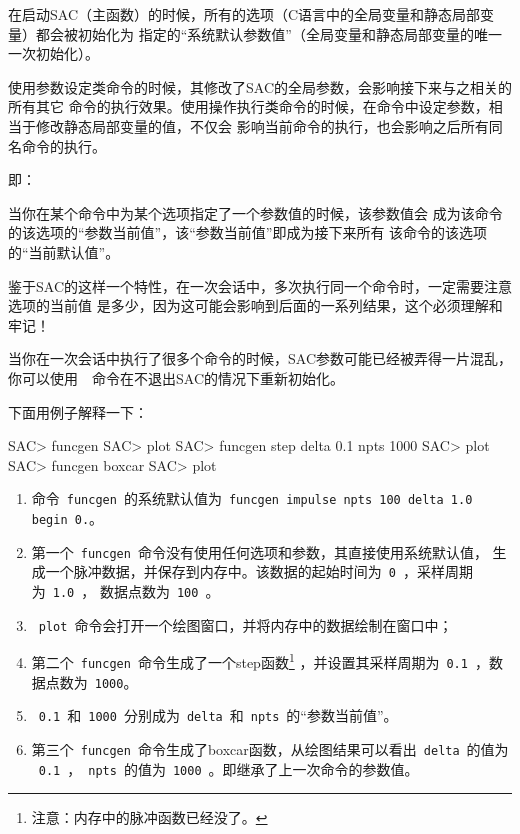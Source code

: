 在启动SAC（主函数）的时候，所有的选项（C语言中的全局变量和静态局部变量）都会被初始化为
指定的``系统默认参数值''（全局变量和静态局部变量的唯一一次初始化）。

使用参数设定类命令的时候，其修改了SAC的全局参数，会影响接下来与之相关的所有其它
命令的执行效果。使用操作执行类命令的时候，在命令中设定参数，相当于修改静态局部变量的值，不仅会
影响当前命令的执行，也会影响之后所有同名命令的执行。

即：

当你在某个命令中为某个选项指定了一个参数值的时候，该参数值会
成为该命令的该选项的``参数当前值''，该``参数当前值''即成为接下来所有
该命令的该选项的``当前默认值''。

鉴于SAC的这样一个特性，在一次会话中，多次执行同一个命令时，一定需要注意选项的当前值
是多少，因为这可能会影响到后面的一系列结果，这个必须理解和牢记！

\begin{Tips}
当你在一次会话中执行了很多个命令的时候，SAC参数可能已经被弄得一片混乱，
你可以使用~~命令在不退出SAC的情况下重新初始化。
\end{Tips}

下面用例子解释一下：
\begin{SACCode}
SAC> funcgen
SAC> plot
SAC> funcgen step delta 0.1 npts 1000
SAC> plot
SAC> funcgen boxcar
SAC> plot
\end{SACCode}

\begin{enumerate}
\item 命令~\lstinline{funcgen}~的系统默认值为~\lstinline{funcgen impulse npts 100 delta 1.0 begin 0.}。
\item 第一个~\lstinline{funcgen}~命令没有使用任何选项和参数，其直接使用系统默认值，
    生成一个脉冲数据，并保存到内存中。该数据的起始时间为~\lstinline{0}~，采样周期为~\lstinline{1.0}~，
    数据点数为~\lstinline{100}~。
\item ~\lstinline{plot}~命令会打开一个绘图窗口，并将内存中的数据绘制在窗口中；
\item 第二个~\lstinline{funcgen}~命令生成了一个step函数\footnote{注意：内存中的脉冲函数已经没了。}
    ，并设置其采样周期为~\lstinline{0.1}~，数据点数为~\lstinline{1000}。
\item ~\lstinline{0.1}~和~\lstinline{1000}~分别成为~\lstinline{delta}~和~\lstinline{npts}~的``参数当前值''。
\item 第三个~\lstinline{funcgen}~命令生成了boxcar函数，从绘图结果可以看出~\lstinline{delta}~的值为
    ~\lstinline{0.1}~，~\lstinline{npts}~的值为~\lstinline{1000}~。即继承了上一次命令的参数值。
\end{enumerate}
